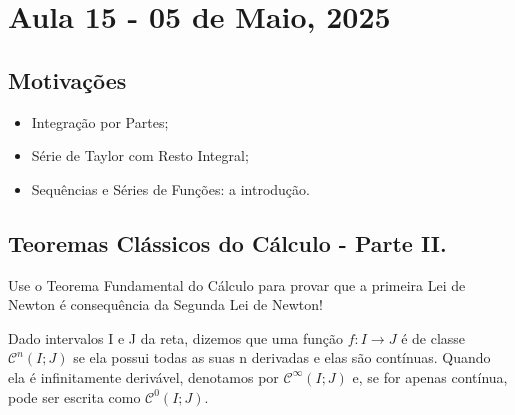 \documentclass[../analysisII_notes.tex]{subfiles}
\begin{document}
\section{Aula 15 - 05 de Maio, 2025}
\subsection{Motivações}
\begin{itemize}
	\item Integração por Partes;
	\item Série de Taylor com Resto Integral;
	\item Sequências e Séries de Funções: a introdução.
\end{itemize}
\subsection{Teoremas Clássicos do Cálculo - Parte II.}
\begin{exr}
	Use o Teorema Fundamental do Cálculo para provar que a primeira Lei de Newton é consequência da Segunda Lei de Newton!
\end{exr}
\begin{tcolorbox}[
		skin=enhanced,
		title=Lembrete!,
		after title={\hfill Classes de Funções Diferenciáveis},
		fonttitle=\bfseries,
		sharp corners=downhill,
		colframe=black,
		colbacktitle=yellow!75!white,
		colback=yellow!30,
		colbacklower=black,
		coltitle=black,
		drop large lifted shadow
	]
	Dado intervalos I e J da reta, dizemos que uma função \(f:I\rightarrow J\) é de classe \(\mathcal{C}^{n}(I;J)\) se ela possui todas as suas n derivadas e elas são contínuas. Quando ela é infinitamente derivável, denotamos por \(\mathcal{C}^{\infty}(I;J)\) e, se for apenas contínua, pode ser escrita como \(\mathcal{C}^{0}(I;J).\)
\end{tcolorbox}
\end{document}

